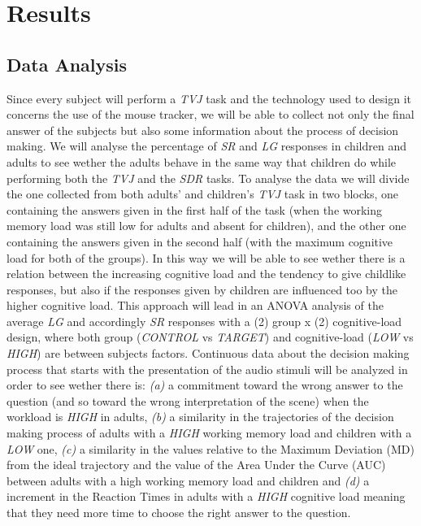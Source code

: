 \documentclass[10pt, a4]{article}
\begin{document}
\section{Results}
\subsection{Data Analysis}
Since every subject will perform a \textit{TVJ} task and the technology used to design it concerns the use of the mouse tracker,
we will be able to collect not only the final answer of the subjects but also some information about the process of decision
making. We will analyse the percentage of \textit{SR} and \textit{LG} responses in children and adults to see wether
the adults behave in the same way that children do while performing both the \textit{TVJ} and the \textit{SDR} tasks.
To analyse the data we will divide the one collected from both adults' and children's \textit{TVJ} task in two blocks, one containing 
the answers given in the first half of the task (when the working memory load was still low for adults and absent
for children), and the other one containing the answers given in the second half (with the maximum cognitive load for both of
the groups). In this way we will be able to see wether there is a relation between the increasing cognitive load and the tendency
to give childlike responses, but also if the responses given by children are influenced too by the higher cognitive load.
This approach will lead in an ANOVA analysis of the average \textit{LG} and accordingly \textit{SR} responses with a (2) group
x (2) cognitive-load design, where both group (\textit{CONTROL} vs \textit{TARGET}) and cognitive-load
(\textit{LOW} vs \textit{HIGH}) are between subjects factors.
Continuous data about the decision making process that starts with the presentation of the audio stimuli will be analyzed
in order to see wether there is: \textit{(a)} a commitment toward the wrong answer to the question (and so toward the
wrong interpretation of the scene) when the workload is \textit{HIGH} in adults, \textit{(b)} a similarity in the trajectories of the
decision making process of adults with a \textit{HIGH} working memory load and children with a \textit{LOW} one, \textit{(c)} a similarity in the values
relative to the Maximum Deviation (MD) from the ideal trajectory and the value of the Area Under the Curve (AUC) between
adults with a high working memory load and children and \textit{(d)} a increment in the Reaction Times in adults with a \textit{HIGH}
cognitive load meaning that they need more time to choose the right answer to the question.
\end{document}
